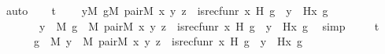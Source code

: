 \begin{isabellebody}
\ auto\isanewline
\isanewline
\ \ \isamarkupfalse%
\ t{}{\isacharcolon}{\kern0pt}\isanewline
\ \ \ \ {\isachardoublequoteopen}{\isacharparenleft}{\kern0pt}{\isasymexists}y{\isacharbrackleft}{\kern0pt}{\isacharhash}{\kern0pt}{\isacharhash}{\kern0pt}M{\isacharbrackright}{\kern0pt}{\isachardot}{\kern0pt}\ {\isasymexists}g{\isacharbrackleft}{\kern0pt}{\isacharhash}{\kern0pt}{\isacharhash}{\kern0pt}M{\isacharbrackright}{\kern0pt}{\isachardot}{\kern0pt}\ pair{\isacharparenleft}{\kern0pt}{\isacharhash}{\kern0pt}{\isacharhash}{\kern0pt}M{\isacharcomma}{\kern0pt}\ x{\isacharcomma}{\kern0pt}\ y{\isacharcomma}{\kern0pt}\ z{\isacharparenright}{\kern0pt}\ {\isasymand}\ is{\isacharunderscore}{\kern0pt}recfun{\isacharparenleft}{\kern0pt}r{\isacharcomma}{\kern0pt}\ x{\isacharcomma}{\kern0pt}\ H{\isacharcomma}{\kern0pt}\ g{\isacharparenright}{\kern0pt}\ {\isasymand}\ y\ {\isacharequal}{\kern0pt}\ H{\isacharparenleft}{\kern0pt}x{\isacharcomma}{\kern0pt}\ g{\isacharparenright}{\kern0pt}{\isacharparenright}{\kern0pt}\isanewline
\ \ \ \ \ \ {\isasymlongleftrightarrow}\ {\isacharparenleft}{\kern0pt}{\isasymexists}y\ {\isasymin}\ M{\isachardot}{\kern0pt}\ {\isasymexists}g\ {\isasymin}\ M{\isachardot}{\kern0pt}\ pair{\isacharparenleft}{\kern0pt}{\isacharhash}{\kern0pt}{\isacharhash}{\kern0pt}M{\isacharcomma}{\kern0pt}\ x{\isacharcomma}{\kern0pt}\ y{\isacharcomma}{\kern0pt}\ z{\isacharparenright}{\kern0pt}\ {\isasymand}\ is{\isacharunderscore}{\kern0pt}recfun{\isacharparenleft}{\kern0pt}r{\isacharcomma}{\kern0pt}\ x{\isacharcomma}{\kern0pt}\ H{\isacharcomma}{\kern0pt}\ g{\isacharparenright}{\kern0pt}\ {\isasymand}\ y\ {\isacharequal}{\kern0pt}\ H{\isacharparenleft}{\kern0pt}x{\isacharcomma}{\kern0pt}\ g{\isacharparenright}{\kern0pt}{\isacharparenright}{\kern0pt}{\isachardoublequoteclose}\ \isamarkupfalse%
\ simp\ \isanewline
\ \ \isamarkupfalse%
\ t{}\ {\isacharcolon}{\kern0pt}\ \isanewline
\ \ \ \ {\isachardoublequoteopen}{\isachardot}{\kern0pt}{\isachardot}{\kern0pt}{\isachardot}{\kern0pt}\ {\isasymlongleftrightarrow}\ {\isacharparenleft}{\kern0pt}{\isasymexists}g\ {\isasymin}\ M{\isachardot}{\kern0pt}\ {\isasymexists}y\ {\isasymin}\ M{\isachardot}{\kern0pt}\ pair{\isacharparenleft}{\kern0pt}{\isacharhash}{\kern0pt}{\isacharhash}{\kern0pt}M{\isacharcomma}{\kern0pt}\ x{\isacharcomma}{\kern0pt}\ y{\isacharcomma}{\kern0pt}\ z{\isacharparenright}{\kern0pt}\ {\isasymand}\ is{\isacharunderscore}{\kern0pt}recfun{\isacharparenleft}{\kern0pt}r{\isacharcomma}{\kern0pt}\ x{\isacharcomma}{\kern0pt}\ H{\isacharcomma}{\kern0pt}\ g{\isacharparenright}{\kern0pt}\ {\isasymand}\ y\ {\isacharequal}{\kern0pt}\ H{\isacharparenleft}{\kern0pt}x{\isacharcomma}{\kern0pt}\ g{\isacharparenright}{\kern0pt}{\isacharparenright}{\kern0pt}{\isachardoublequoteclose}\ \isamarkupfalse%

\end{isabellebody}
